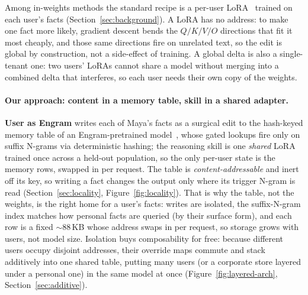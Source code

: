 \documentclass[letterpaper]{article} %
\begin{document}
Among in-weights methods the standard recipe is a per-user
LoRA~\citep{hu2022lora} trained on each user's facts
(Section~\ref{sec:background}). A LoRA has no address: to
make one fact more likely, gradient descent bends the $Q/K/V/O$
directions that fit it most cheaply, and those same directions fire on
unrelated text, so the edit is global by construction, not a
side-effect of training. A global delta is also a single-tenant one:
two users' LoRAs cannot share a model without merging into a combined
delta that interferes, so each user needs their own copy of the
weights.

\paragraph{Our approach: content in a memory table, skill in a shared adapter.}
\textbf{User as Engram} writes each of Maya's facts as a surgical edit
to the hash-keyed memory table of an Engram-pretrained
model~\citep{cheng2026engram}, whose gated lookups fire only on suffix
N-grams via deterministic hashing; the reasoning skill is one
\emph{shared} LoRA trained once across a held-out population, so the
only per-user state is the memory rows, swapped in per request. The
table is \emph{content-addressable} and inert off its key, so writing a fact
changes the output only where its trigger N-gram is read
(Section~\ref{sec:locality}, Figure~\ref{fig:locality}). That is why
the table, not the weights, is the right home for a user's facts:
writes are isolated, the
suffix-N-gram index matches how personal facts are queried (by their
surface form), and each row is a fixed $\sim$88\,KB whose address swaps
in per request, so storage grows with users, not model size.
Isolation buys composability for free: because different users occupy
disjoint addresses, their override maps commute and stack additively
into one shared table, putting many users (or a corporate store layered
under a personal one) in the same model at once (Figure~\ref{fig:layered-arch},
Section~\ref{sec:additive}).
\end{document}
